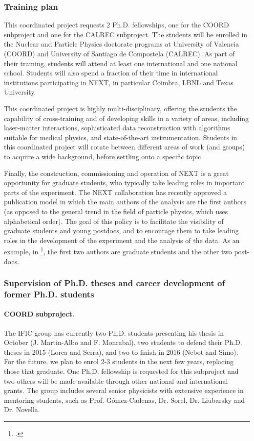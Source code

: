 \subsubsection*{\label{subsubsec:training}Training plan}

This coordinated project requests 2 Ph.D. fellowships, one for the COORD subproject and one for the CALREC subproject. The students will be enrolled in the Nuclear and Particle Physics doctorate programs at University of Valencia (COORD) and University of Santiago de Compostela (CALREC). As part of their training, students will attend at least one international and one national school. Students will also spend a fraction of their time in international institutions participating in NEXT, in particular Coimbra, LBNL and Texas University. 

This coordinated project is highly multi-disciplinary, offering the students the capability of cross-training and of developing skills in a variety of areas, including laser-matter interactions, sophisticated data reconstruction with algorithms suitable for medical physics, and state-of-the-art instrumentation. Students in this coordinated project will rotate between different areas of work (and groups) to acquire a wide background, before settling onto a specific topic. 

Finally, the construction, commissioning and operation of NEXT is a great opportunity for graduate students, who typically take leading roles in important parts of the experiment. The NEXT collaboration has recently approved a publication model in which the main authors of the analysis are the first authors (as opposed to the general trend in the field of particle physics, which uses alphabetical order). The goal of this policy is to facilitate the visibility of graduate students and young postdocs, and to encourage them to take leading roles in the development of the experiment and the analysis of the data. As an example, in \footcite{Lorca:2014sra}, the first two authors are graduate students and the other two post-docs.



\subsubsection*{Supervision of Ph.D. theses and career development of former Ph.D. students}

\paragraph{COORD subproject.}
The IFIC group has currently two Ph.D. students presenting his thesis in October (J. Martin-Albo and F. Monrabal), two students to defend their Ph.D. theses in 2015 (Lorca and Serra), and two to finish in 2016 (Nebot and Simo). For the future, we plan to enrol 2-3 students in the next few years, replacing those that graduate. One Ph.D. fellowship is requested for this subproject and two others will be made available through other national and international grants. The group includes several senior physicists with extensive experience in mentoring students, such as Prof. G\'omez-Cadenas, Dr. Sorel, Dr. Liubarsky and Dr. Novella. 

